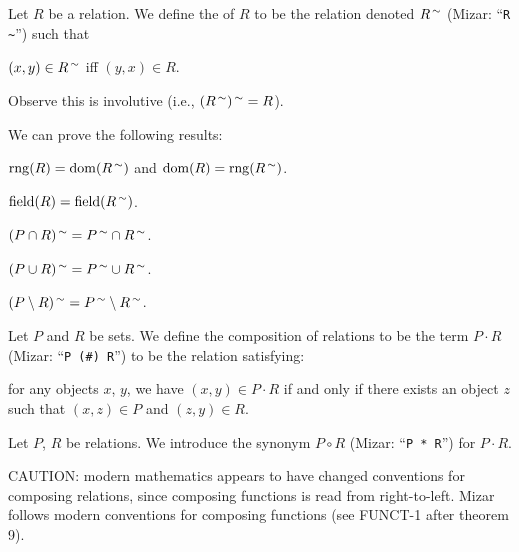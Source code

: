 \documentclass{article}
\begin{document}
\begin{definition}
Let $R$ be a relation. We define the  of $R$
to be the relation denoted $R^{\,\sim}$ (Mizar: ``\verb#R ~#'') such that
\begin{defn}
\item $(x,y)\in R^{\,\sim}$ iff $(y,x)\in R$.
\end{defn}
Observe this is involutive (i.e., $(R^{\,\sim})^{\,\sim}=R$).
\end{definition}

We can prove the following results:
\begin{thm}
\item\label{relat1:20} $\operatorname{rng}(R)=\operatorname{dom}(R^{\,\sim})$ and
  $\operatorname{dom}(R)=\operatorname{rng}(R^{\,\sim})$.
\item\label{relat1:21} $\operatorname{field}(R)=\operatorname{field}(R^{\,\sim})$.
\item\label{relat1:22} $(P\cap R)^{\,\sim}=P^{\,\sim}\cap R^{\,\sim}$.
\item\label{relat1:23} $(P\cup R)^{\,\sim}=P^{\,\sim}\cup R^{\,\sim}$.
\item\label{relat1:24} $(P\setminus R)^{\,\sim}=P^{\,\sim}\setminus R^{\,\sim}$.
\end{thm}

\begin{definition}
Let $P$ and $R$ be sets. We define the composition of relations to be
the term $P\cdot R$ (Mizar: ``\verb|P (#) R|'') to be the relation satisfying:
\begin{defn}
\item for any objects $x$, $y$, we have $(x,y)\in P\cdot R$ if and only
  if there exists an object $z$ such that $(x,z)\in P$ and $(z,y)\in R$.
\end{defn}
\end{definition}

\begin{notation}
Let $P$, $R$ be relations. We introduce the synonym $P\circ R$ (Mizar:
``\verb#P * R#'') for $P\cdot R$.
\end{notation}

\begin{remark}
CAUTION: modern mathematics appears to have changed conventions for
composing relations, since composing functions is read from right-to-left.
Mizar follows modern conventions for composing functions (see FUNCT-1
after theorem 9).
\end{remark}

\begin{thm}
\item\label{relat1:2}
\end{thm}
\end{document}
